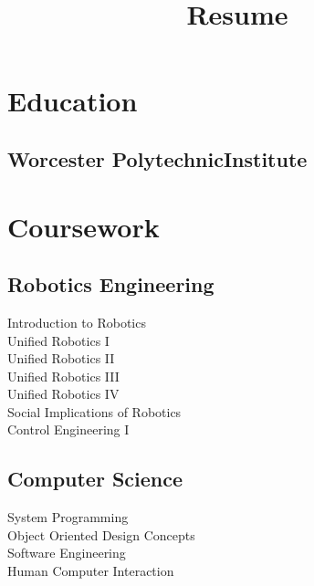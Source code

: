 \documentclass[]{deedy-resume-openfont}
\begin{document}
\title{Resume}
%
%

%
%

\begin{minipage}[t]{0.33\textwidth} 


\section{Education} 

\subsection{Worcester Polytechnic\newline Institute}
\sectionsep
\section{Coursework}
\subsection{Robotics Engineering}
Introduction to Robotics\\
Unified Robotics I\\
Unified Robotics II\\
Unified Robotics III\\
Unified Robotics IV\\
Social Implications of Robotics\\
Control Engineering I
\sectionsep
\subsection{Computer Science}
System Programming \\
Object Oriented Design Concepts\\
Software Engineering\\
Human Computer Interaction
\sectionsep

\end{minipage}
\end{document}
